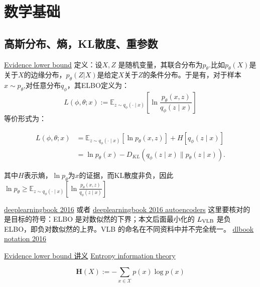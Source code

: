 \chapter{数学基础}

\section{高斯分布、熵，KL散度、重参数}

\href{https://en.wikipedia.org/wiki/Evidence_lower_bound}{Evidence lower bound}
定义：设$X, Z$ 是随机变量，其联合分布为$p_{\theta}$.比如$p_{\theta}(X)$是关于$X$的边缘分布，$p_{\theta}(Z|X)$是给定$X$关于$Z$的条件分布。于是有，对于样本$x \sim p_{\theta}$,对任意分布$q_{\phi}$，其ELBO定义为：
\begin{equation}
L(\phi, \theta ; x):=\mathbb{E}_{z \sim q_\phi(\cdot \mid x)}\left[\ln \frac{p_\theta(x, z)}{q_\phi(z \mid x)}\right]
\end{equation}
等价形式为：

\begin{equation}
\begin{aligned}
L(\phi, \theta ; x) & 
=\mathbb{E}_{z \sim q_\phi(\cdot \mid x)}\left[\ln p_\theta(x, z)
\right]+H\left[q_\phi(z \mid x)\right] \\ & 
=\ln p_\theta(x)-D_{K L}\left(q_\phi(z \mid x) \| p_\theta(z \mid x)\right) .
\end{aligned}
\end{equation}

其中$H$表示熵，$\ln p_{\theta}$为$x$的证据，而KL散度非负，因此
$\ln p_{\theta} \geq \mathbb{E}_{z \sim q_\phi(\cdot \mid x)}
\left[\ln \frac{p_\theta(x, z)}{q_\phi(z \mid x)}\right]
$

\href{https://github.com/janishar/mit-deep-learning-book-pdf}{deeplearningbook 2016} 或者
\href{https://www.deeplearningbook.org/contents/autoencoders.html}{deeplearningbook 2016 autoencoders} 
这里要核对的是目标的符号：ELBO 是对数似然的下界；本文后面最小化的 $L_{\rm VLB}$ 是负 ELBO，即负对数似然的上界。VLB 的命名在不同资料中并不完全统一。
\href{https://github.com/goodfeli/dlbook_notation}{dlbook notation 2016}

\href{https://www.inf.ed.ac.uk/teaching/courses/fmcs1/slides/lecture25.pdf}{Evidence lower bound 讲义}
\href{https://en.wikipedia.org/wiki/Entropy\_(information\_theory)}{Entropy information theory }

\begin{equation}
\mathbf{H}(X):=-\sum_{x \in \mathcal{X}} p(x) \log p(x)
\end{equation}

